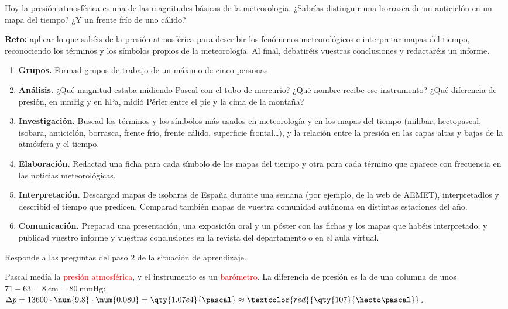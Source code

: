 Hoy la presión atmosférica es una de las magnitudes básicas de la meteorología. ¿Sabrías distinguir una borrasca de un anticiclón en un mapa del tiempo? ¿Y un frente frío de uno cálido?

\begin{marker}
    \textbf{Reto:} aplicar lo que sabéis de la presión atmosférica para describir los fenómenos meteorológicos e interpretar mapas del tiempo, reconociendo los términos y los símbolos propios de la meteorología. Al final, debatiréis vuestras conclusiones y redactaréis un informe.
\end{marker}

\begin{enumerate}[label=\numberballred]
    \item \textbf{Grupos.} Formad grupos de trabajo de un máximo de cinco personas.
    \item \textbf{Análisis.} ¿Qué magnitud estaba midiendo Pascal con el tubo de mercurio? ¿Qué nombre recibe ese instrumento? ¿Qué diferencia de presión, en \unit{\mmHg} y en \unit{\hecto\pascal}, midió Périer entre el pie y la cima de la montaña?
    \item \textbf{Investigación.} Buscad los términos y los símbolos más usados en meteorología y en los mapas del tiempo (milibar, hectopascal, isobara, anticiclón, borrasca, frente frío, frente cálido, superficie frontal\ldots), y la relación entre la presión en las capas altas y bajas de la atmósfera y el tiempo.
    \item \textbf{Elaboración.} Redactad una ficha para cada símbolo de los mapas del tiempo y otra para cada término que aparece con frecuencia en las noticias meteorológicas.
    \item \textbf{Interpretación.} Descargad mapas de isobaras de España durante una semana (por ejemplo, de la web de AEMET), interpretadlos y describid el tiempo que predicen. Comparad también mapas de vuestra comunidad autónoma en distintas estaciones del año.
    \item \textbf{Comunicación.} Preparad una presentación, una exposición oral y un póster con las fichas y los mapas que habéis interpretado, y publicad vuestro informe y vuestras conclusiones en la revista del departamento o en el aula virtual.
\end{enumerate}

\begin{exercise}
    Responde a las preguntas del paso 2 de la situación de aprendizaje.
    \begin{solu}
        Pascal medía la \textcolor{red}{presión atmosférica}, y el instrumento es un \textcolor{red}{barómetro}. La diferencia de presión es la de una columna de unos \(71 - 63 = \qty{8}{\cm} = \qty{80}{\mmHg}\):
        \(\Delta p = 13600 \cdot \num{9.8} \cdot \num{0.080} = \qty{1.07e4}{\pascal} \approx \textcolor{red}{\qty{107}{\hecto\pascal}}\).
    \end{solu}
\end{exercise}

